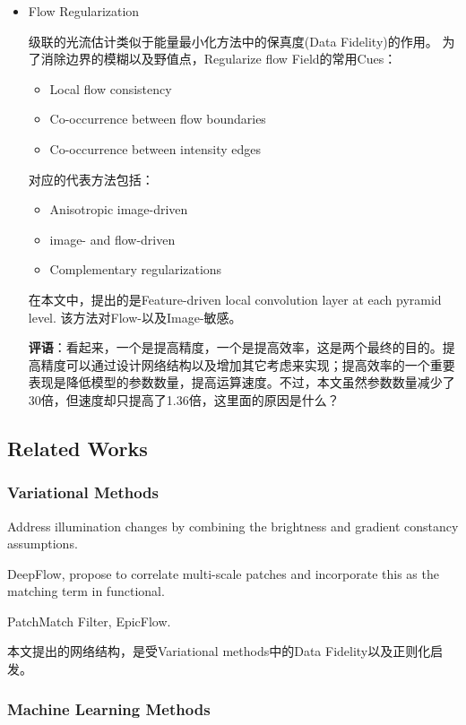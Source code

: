 \begin{itemize}
\item Flow Regularization

级联的光流估计类似于能量最小化方法中的保真度(Data Fidelity)的作用。 为了消除边界的模糊以及野值点，Regularize flow Field的常用Cues：
\begin{itemize}
\item Local flow consistency
\item Co-occurrence between flow boundaries
\item Co-occurrence between intensity edges
\end{itemize}

对应的代表方法包括：
\begin{itemize}
\item Anisotropic image-driven
\item image- and flow-driven
\item Complementary regularizations
\end{itemize}

在本文中，提出的是Feature-driven local convolution layer at each pyramid level. 该方法对Flow-以及Image-敏感。

{\color{red} \textbf{评语}：看起来，一个是提高精度，一个是提高效率，这是两个最终的目的。提高精度可以通过设计网络结构以及增加其它考虑来实现；提高效率的一个重要表现是降低模型的参数数量，提高运算速度。不过，本文虽然参数数量减少了30倍，但速度却只提高了1.36倍，这里面的原因是什么？}

\end{itemize}

\subsection{Related Works}

\subsubsection{Variational Methods}

Address illumination changes by combining the brightness and gradient constancy assumptions.

DeepFlow, propose to correlate multi-scale patches and incorporate this as the matching term in functional.

PatchMatch Filter, EpicFlow.

本文提出的网络结构，是受Variational methods中的Data Fidelity以及正则化启发。

\subsubsection{Machine Learning Methods}

